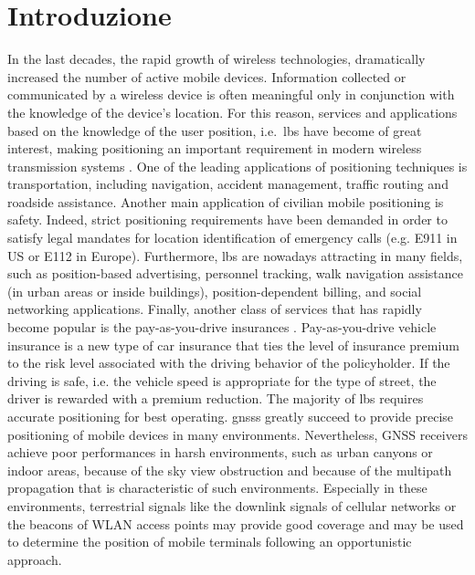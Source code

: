 \chapter{Introduzione}
\label{chap:Introduction}
\glsresetall
In the last decades, the rapid growth of wireless technologies, dramatically increased the number of 
active mobile devices. Information collected or communicated by a wireless device is often meaningful 
only in conjunction with the knowledge of the device's location. For this reason, services and applications 
based on the knowledge of the user position, i.e.~\gls{lbs} have become of great interest, making
positioning an important requirement in modern wireless transmission systems \cite{Positioning_book1,Positioning_book2,Locating_the_nodes_cooperative_localization,Localization_via_ultra_wideband_radios_a_look}.
One of the leading applications of positioning techniques is transportation, including navigation, 
accident management, traffic routing and roadside assistance.
Another main application of civilian mobile positioning is safety. Indeed, strict  
positioning requirements have been demanded in order to satisfy legal mandates 
for location identification of emergency calls (e.g. E911 in US or E112 in Europe). 
Furthermore, \gls{lbs} are nowadays attracting in many fields, such as position-based advertising, 
personnel tracking, walk navigation assistance (in urban areas or inside buildings), 
position-dependent billing, 
and social networking applications. Finally, another class of services that has 
rapidly become popular is the pay-as-you-drive insurances \cite{Pay_as_you_drive_insurance}. 
Pay-as-you-drive vehicle insurance is a new type of car insurance that
ties the level of insurance premium to the risk level associated with the driving behavior of
the policyholder. If the driving is safe, i.e. the vehicle speed is appropriate for 
the type of street, the driver is rewarded with a premium reduction. 
The majority of \gls{lbs} requires accurate positioning for best operating.  
\glspl{gnss} greatly succeed to provide precise positioning of mobile devices in many 
environments. Nevertheless, GNSS receivers achieve poor performances in harsh 
environments, such as urban canyons or indoor areas, because of the sky view obstruction and 
because of the multipath propagation that is characteristic of such environments. 
Especially in these environments, terrestrial signals like the downlink signals of cellular networks 
or the beacons of WLAN access points may provide good coverage and may be used to determine the position 
of mobile terminals following an opportunistic approach.
